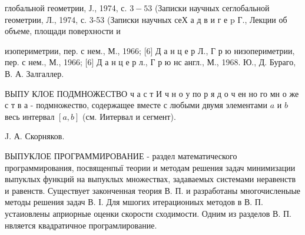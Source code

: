 \documentclass[10pt]{article}
\begin{document}
глобальной геометрии, Ј., 1974, с. $3-53$ (Записки научных сеглобальной геометрии, Л., 1974, с. 3-53 (Записки научных сеХ а д в и г е p Г., Лекции об объеме, площади поверхности и

изопериметрии, пер. с нем., М., 1966; [6] Д а н ц е р Л., Г р ю низопериметрии, пер. с нем., М., 1966; [6] Д а н ц е р л., Г р ю нс англ., М., 1968. Ю., Д. Бураго, В. А. Залгаллер.



ВЫПУ КЛОЕ ПОДМНОЖЕСТВО ч а с т И ч н о у по р я д о ч ен но го мн о же с т в а - подмножество, содержащее вместе с любыми двумя элементами $a$ и $b$ весь интервал $[a, b]$ (см. Иитервал и сегмент).

J. А. Скорняков.



ВЫПУКЛОЕ ПРОГРАММИРОВАНИЕ - раздел математического программирования, посвященпыї теории и методам решения задач минимизации выпуклых функций на выпуклых множествах, задаваемых системами неравенств и равенств. Существует законченная теория В. П. и разработаны многочисленыые методы решения задач В. І. Для мшогих итерациониых методов в В. П. устаиовлены априорные оценки скорости сходимости. Одним из разделов В. П. нвляется квадратичное програмлирование.
\end{document}
